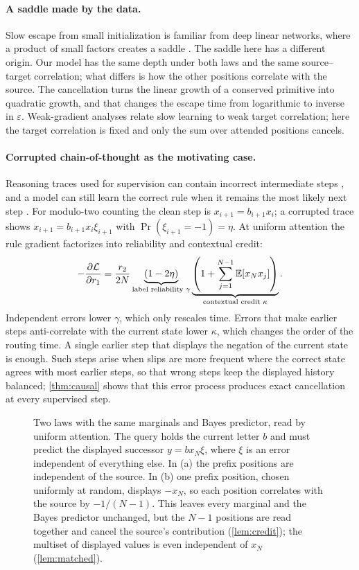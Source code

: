 \paragraph{A saddle made by the data.}
Slow escape from small initialization is familiar from deep linear networks, where a product of small factors creates a saddle
\citep{saxe2014exact,shamir2019exponential}. The saddle here has a different origin. Our model has the same depth under both laws and the same
source--target correlation; what differs is how the other positions correlate with the source. The cancellation turns the linear growth of a
conserved primitive into quadratic growth, and that changes the escape time from logarithmic to inverse in $\varepsilon$.
Weak-gradient analyses \citep{shalevshwartz2017failures,abbe2025parities} relate slow learning to weak target correlation; here the target correlation is fixed
and only the sum over attended positions cancels.

\paragraph{Corrupted chain-of-thought as the motivating case.}
Reasoning traces used for supervision can contain incorrect intermediate steps \citep{havrilla2024noise,zhou2024noisyrationales},
and a model can still learn the correct rule when it remains the most likely next step \citep{natarajan2013noisy,patrini2017loss}.
For modulo-two counting the clean step is $x_{i+1}=b_{i+1}x_i$; a corrupted trace shows $x_{i+1}=b_{i+1}x_i\xi_{i+1}$ with $\Pr(\xi_{i+1}=-1)=\eta$.
At uniform attention the rule gradient factorizes into reliability and contextual credit:
\[
 -\frac{\partial \mathcal L}{\partial r_1}
 =\frac{r_2}{2N}
 \underbrace{(1-2\eta)}_{\text{label reliability }\gamma}
 \underbrace{\left(1+\sum_{j=1}^{N-1}\mathbb E[x_Nx_j]\right)}_{\text{contextual credit }\kappa}.
\]
Independent errors lower $\gamma$, which only rescales time. Errors that make earlier steps anti-correlate with the current state lower $\kappa$,
which changes the order of the routing time. A single earlier step that displays the negation of the current state is enough.
Such steps arise when slips are more frequent where the correct state agrees with most earlier steps, so that wrong steps keep the displayed
history balanced; \cref{thm:causal} shows that this error process produces exact cancellation at every supervised step.

\begin{figure}[t]
\centering
\resizebox{\linewidth}{!}{}
\caption{Two laws with the same marginals and Bayes predictor, read by uniform attention. The query holds the current letter $b$ and
must predict the displayed successor $y=b x_N \xi$, where $\xi$ is an error independent of everything else. In (a) the prefix
positions are independent of the source. In (b) one prefix position, chosen uniformly at random, displays $-x_N$, so each position
correlates with the source by $-1/(N-1)$. This leaves every marginal and the Bayes predictor unchanged, but the $N-1$ positions are read
together and cancel the source's contribution (\cref{lem:credit}); the multiset of displayed values is even independent of $x_N$ (\cref{lem:matched}).}
\label{fig:cancel}
\end{figure}

